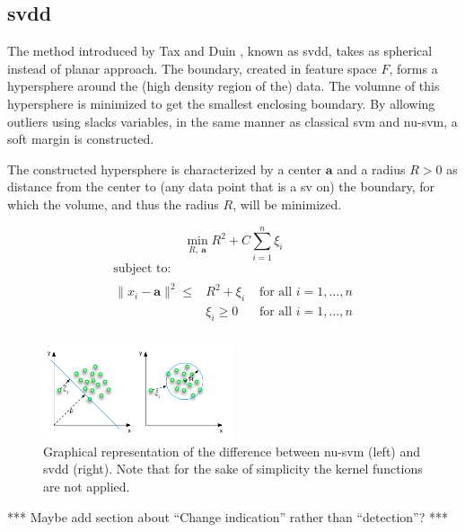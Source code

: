 
\subsection{\acrlong{svdd}}\label{subsec:svdd}
The method introduced by Tax and Duin \cite{tax2004support}, known as \acrlong{svdd}, takes as spherical instead of planar approach.
The boundary, created in feature space $F$, forms a hypersphere around the (high density region of the) data.
The volumne of this hypersphere is minimized to get the smallest enclosing boundary.
By allowing outliers using slacks variables, in the same manner as classical \gls{svm} and \gls{nu-svm}, a soft margin is constructed.

The constructed hypersphere is characterized by a center $\mathbf{a}$ and a radius $R > 0$ as distance from the center to (any data point that is a \gls{sv} on) the boundary, for which the volume, and thus the radius $R$, will be minimized.

\begin{equation}\label{eq:svdd_objective}
  \operatorname*{min}_{R,\ \mathbf{a} } R^2 + C \sum_{i=1}^n \xi_i
\end{equation}
\begin{equation}
  \begin{multlined}
    \mbox{ subject to: } \\
    \begin{aligned}
      \lVert x_i - \mathbf{a} \rVert ^ 2 \leq & R^2 + \xi_i & \mbox{ for all } i = 1, \dots, n \\
      & \xi_i \geq 0 & \mbox{ for all } i = 1, \dots, n \\
    \end{aligned}
  \end{multlined}
\end{equation}

\begin{figure}
  \centering
    \includegraphics[width=0.5\textwidth,keepaspectratio]{./Figures/chapter3/nu-vs-svdd.pdf}
  \caption[Difference \gls{nu-svm} and \gls{svdd}]{Graphical representation of the difference between \gls{nu-svm} (left) and \gls{svdd} (right). Note that for the sake of simplicity the kernel functions are not applied.}
  \label{fig:nu-vs-svdd}
\end{figure}



*** Maybe add section about ``Change indication'' rather than ``detection''? ***
